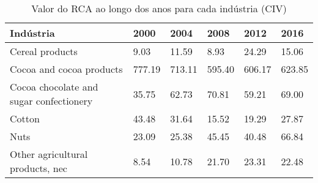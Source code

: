 \begin{table}
\centering
\caption{Valor do RCA ao longo dos anos para cada indústria (CIV)}
\label{tab:ex3-tempo-CIV}
\begin{tabular}{p{6cm}p{1.5cm}p{1.5cm}p{1.5cm}p{1.5cm}p{1.5cm}}
\toprule
                              Indústria &   2000 &   2004 &   2008 &   2012 &   2016 \\
\midrule
                        Cereal products &   9.03 &  11.59 &   8.93 &  24.29 &  15.06 \\
               Cocoa and cocoa products & 777.19 & 713.11 & 595.40 & 606.17 & 623.85 \\
Cocoa chocolate and sugar confectionery &  35.75 &  62.73 &  70.81 &  59.21 &  69.00 \\
                                 Cotton &  43.48 &  31.64 &  15.52 &  19.29 &  27.87 \\
                                   Nuts &  23.09 &  25.38 &  45.45 &  40.48 &  66.84 \\
       Other agricultural products, nec &   8.54 &  10.78 &  21.70 &  23.31 &  22.48 \\
\bottomrule
\end{tabular}
\end{table}
